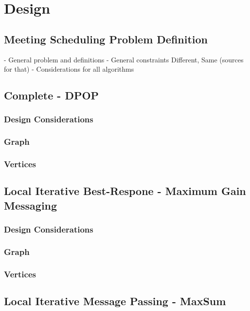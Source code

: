 \chapter{Design}
\section{Meeting Scheduling Problem Definition}

- General problem and definitions
- General constraints Different, Same (sources for that)
- Considerations for all algorithms


\section{Complete - DPOP}
\subsection{Design Considerations}
\subsection{Graph}
\subsection{Vertices}


\section{Local Iterative Best-Respone - Maximum Gain Messaging}
\subsection{Design Considerations}
\subsection{Graph}
\subsection{Vertices}


\section{Local Iterative Message Passing - MaxSum}
